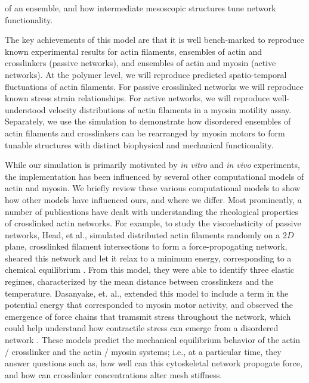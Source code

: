 \documentclass[12pt]{article}
\begin{document}
of an ensemble, and how intermediate mesoscopic structures tune network functionality.
\par
The key achievements of this model are that it is well bench-marked to reproduce known experimental results for actin
filaments, ensembles of actin and crosslinkers (passive networks), and ensembles of actin and myosin 
(active networks). 
At the polymer level, we will reproduce predicted spatio-temporal fluctuations of actin filaments. 
For passive crosslinked networks we will reproduce known stress strain
relationships. For active networks, we will reproduce well-understood velocity distributions of actin
filaments in a myosin motility assay. Separately, we use the simulation to demonstrate how disordered ensembles of 
actin filaments and crosslinkers can be rearranged by myosin motors to form tunable structures with distinct biophysical and
mechanical functionality\cite{freedman2016}.  
\par
While our simulation is primarily motivated by \textit{in vitro} and \textit{in vivo} experiments, the implementation 
has been influenced by several other computational models of actin and myosin. 
We briefly review these various computational models to show how other models have
influenced ours, and where we differ.
Most prominently, a number of publications have dealt with understanding the rheological properties of crosslinked actin
networks\cite{mackintosh1995, head2003, wilhelm2003, kim2009}.  
For example, to study the viscoelasticity of passive networks,  Head, et al., simulated distributed actin filaments randomly 
on a $2D$ plane, crosslinked filament intersections to form a force-propogating network, sheared 
this network and let it relax to a minimum energy, corresponding to a chemical equilibrium \cite{head2003}. 
From this model, they were able to identify three elastic regimes,
characterized by the mean distance between crosslinkers and the temperature. 
Dasanyake, et. al., extended this model to include a term in the potential energy that corresponded to
myosin motor activity, and observed the emergence of force chains that tramsmit stress throughout the network,
which could help understand how contractile stress can emerge from a disordered network \cite{dasanyake2011}.
These models predict the mechanical equilibrium behavior of the actin / crosslinker and the actin / myosin
systems; i.e., at a particular time, they answer questions such as, how well can this cytoskeletal network propogate
force, and how can crosslinker concentrations alter mesh stiffness.
\par
\end{document}
